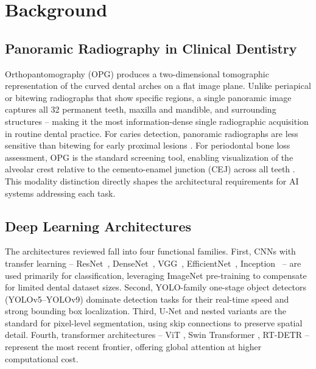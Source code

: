 \documentclass[conference]{IEEEtran}
\begin{document}
\section{Background}
\label{sec:background}

\subsection{Panoramic Radiography in Clinical Dentistry}

Orthopantomography (OPG) produces a two-dimensional tomographic
representation of the curved dental arches on a flat image plane. Unlike
periapical or bitewing radiographs that show specific regions, a single
panoramic image captures all 32 permanent teeth, maxilla and mandible,
and surrounding structures -- making it the most information-dense
single radiographic acquisition in routine dental practice. For caries
detection, panoramic radiographs are less sensitive than bitewing for
early proximal lesions \cite{perez2024ai,bizjak2024advancing,pornprasertsuk2025clinical}.
For periodontal bone loss assessment, OPG is the standard screening
tool, enabling visualization of the alveolar crest relative to the
cemento-enamel junction (CEJ) across all teeth
\cite{jundaeng2025advanced,iacob2025automated,khubrani2025detection}.
This modality distinction directly shapes the architectural requirements
for AI systems addressing each task.

\subsection{Deep Learning Architectures}

The architectures reviewed fall into four functional families. First,
CNNs with transfer learning -- ResNet~\cite{khuwaja2024ai},
DenseNet~\cite{kaushik2025densenet201,kaushik2025densenet201,ozdemir2026enhanced},
VGG~\cite{mathur2025comparative}, EfficientNet~\cite{chen2023deep},
Inception~\cite{gamal2025automated,zancan2025ai} -- are used primarily
for classification, leveraging ImageNet pre-training to compensate for
limited dental dataset sizes. Second, YOLO-family one-stage object
detectors (YOLOv5--YOLOv9)
\cite{ayhan2025detection,nassiri2025yolo,bizjak2024advancing,muresanu2024automating,pornprasertsuk2025clinical}
dominate detection tasks for their real-time speed and strong bounding
box localization. Third, U-Net and nested variants
\cite{alharbi2023detection,asci2024deep,lim2024dual,kong2024integrating,zanini2024systematic}
are the standard for pixel-level segmentation, using skip connections to
preserve spatial detail. Fourth, transformer architectures -- ViT
\cite{bhoopalan2026self}, Swin Transformer
\cite{vannistelrooij2024combining,zhang2025reliable}, RT-DETR
\cite{karamuftuo2025panoramic} -- represent the most recent frontier,
offering global attention at higher computational cost.
\end{document}
